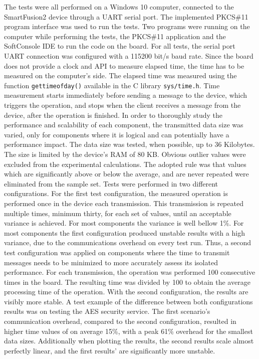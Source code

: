 The tests were all performed on a Windows 10 computer, connected to the SmartFusion2 device through a \ac{UART} serial port. The implemented PKCS\#11 program interface was used to run the tests.
Two programs were running on the computer while performing the tests, the PKCS\#11 application and the SoftConsole \ac{IDE} to run the code on the board.
For all tests, the serial port UART connection was configured with a 115200 bit/s baud rate.%
Since the board does not provide a clock and \ac{API} to measure elapsed time, the time has to be measured on the computer's side.
The elapsed time was measured using the function \texttt{gettimeofday()} available in the C library \texttt{sys/time.h}.
Time measurement starts immediately before sending a message to the device, which triggers the operation, and stops when the client receives a message from the device, after the operation is finished.
In order to thoroughly study the performance and scalability of each component, the transmitted data size was varied, only for components where it is logical and can potentially have a performance impact. The data size was tested, when possible, up to 36 Kilobytes. The size is limited by the device's \ac{RAM} of 80 KB.
Obvious outlier values were excluded from the experimental calculations. The adopted rule was that values which are significantly above or below the average, and are never repeated were eliminated from the sample set.
Tests were performed in two different configurations.
For the first test configuration, the measured operation is performed once in the device each transmission. This transmission is repeated multiple times, minimum thirty, for each set of values, until an acceptable variance is achieved. For most components the variance is well bellow 1\%.
For most components the first configuration produced unstable results with a high variance, due to the communications overhead on every test run.
Thus, a second test configuration was applied on components where the time to transmit messages needs to be minimized to more accurately assess its isolated performance. For each transmission, the operation was performed 100 consecutive times in the board. The resulting time was divided by 100 to obtain the average processing time of the operation.
With the second configuration, the results are visibly more stable.
A test example of the difference between both configurations results was on testing the \ac{AES} security service. The first scenario's communication overhead, compared to the second configuration, resulted in higher time values of on average 15\%, with a peak 61\% overhead for the smallest data sizes. Additionally when plotting the results, the second results scale almost perfectly linear, and the first results' are significantly more unstable.

